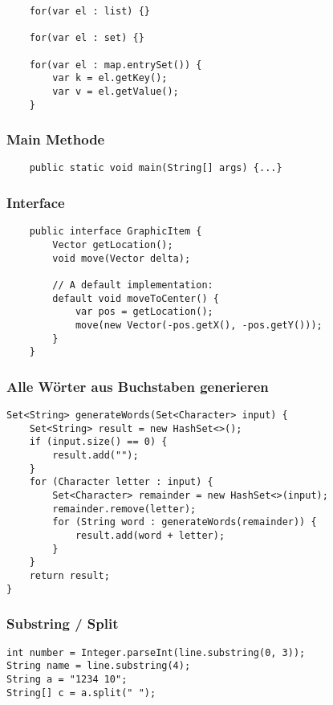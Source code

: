 \begin{multicols*}{5}
\begin{lstlisting}
	for(var el : list) {}
	
	for(var el : set) {}
	
	for(var el : map.entrySet()) {
		var k = el.getKey();
		var v = el.getValue();
	}
	\end{lstlisting}

	\subsubsection{Main Methode}
	\begin{lstlisting}
	public static void main(String[] args) {...}	
	\end{lstlisting}

	\subsubsection{Interface}
	\begin{lstlisting}
	public interface GraphicItem {
		Vector getLocation();
		void move(Vector delta);
		
		// A default implementation:
		default void moveToCenter() {
			var pos = getLocation();
			move(new Vector(-pos.getX(), -pos.getY()));
		}
	}
	\end{lstlisting}

	\columnbreak

	\subsubsection{Alle Wörter aus Buchstaben generieren}
		\begin{lstlisting}
Set<String> generateWords(Set<Character> input) { 
	Set<String> result = new HashSet<>();
	if (input.size() == 0) { 
		result.add(""); 
	}
	for (Character letter : input) {
		Set<Character> remainder = new HashSet<>(input); 
		remainder.remove(letter);
		for (String word : generateWords(remainder)) {
			result.add(word + letter);
		}
	}
	return result;
}
		\end{lstlisting}
	
	\subsubsection{Substring / Split}
		\begin{lstlisting}
int number = Integer.parseInt(line.substring(0, 3));
String name = line.substring(4);
String a = "1234 10"; 
String[] c = a.split(" ");
		\end{lstlisting}



\end{multicols*}
